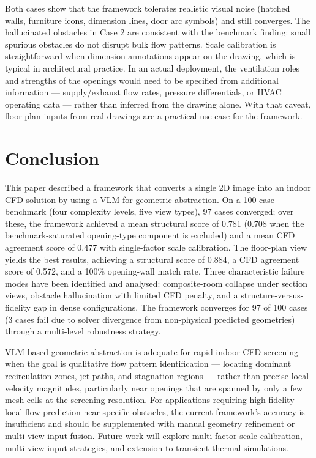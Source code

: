 \documentclass[preprint,12pt,number]{elsarticle}
\begin{document}
Both cases show that the framework tolerates realistic visual noise (hatched walls, furniture icons, dimension lines, door arc symbols) and still converges. The hallucinated obstacles in Case 2 are consistent with the benchmark finding: small spurious obstacles do not disrupt bulk flow patterns. Scale calibration is straightforward when dimension annotations appear on the drawing, which is typical in architectural practice. In an actual deployment, the ventilation roles and strengths of the openings would need to be specified from additional information --- supply/exhaust flow rates, pressure differentials, or HVAC operating data --- rather than inferred from the drawing alone. With that caveat, floor plan inputs from real drawings are a practical use case for the framework.

\section{Conclusion}
\label{sec:conclusion}


This paper described a framework that converts a single 2D image into an indoor CFD solution by using a VLM for geometric abstraction. On a 100-case benchmark (four complexity levels, five view types), 97 cases converged; over these, the framework achieved a mean structural score of 0.781 (0.708 when the benchmark-saturated opening-type component is excluded) and a mean CFD agreement score of 0.477 with single-factor scale calibration. The floor-plan view yields the best results, achieving a structural score of 0.884, a CFD agreement score of 0.572, and a 100\% opening-wall match rate. Three characteristic failure modes have been identified and analysed: composite-room collapse under section views, obstacle hallucination with limited CFD penalty, and a structure-versus-fidelity gap in dense configurations. The framework converges for 97 of 100 cases (3 cases fail due to solver divergence from non-physical predicted geometries) through a multi-level robustness strategy.

VLM-based geometric abstraction is adequate for rapid indoor CFD screening when the goal is qualitative flow pattern identification --- locating dominant recirculation zones, jet paths, and stagnation regions --- rather than precise local velocity magnitudes, particularly near openings that are spanned by only a few mesh cells at the screening resolution. For applications requiring high-fidelity local flow prediction near specific obstacles, the current framework's accuracy is insufficient and should be supplemented with manual geometry refinement or multi-view input fusion. Future work will explore multi-factor scale calibration, multi-view input strategies, and extension to transient thermal simulations.
\end{document}
